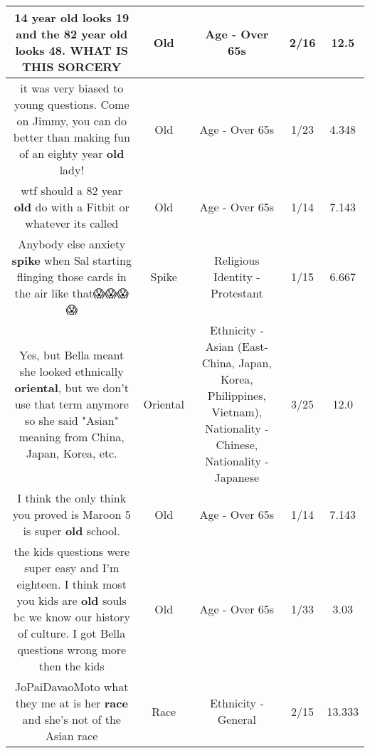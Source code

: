 \documentclass[11pt]{article}
\newlength\mylength
\begin{document}
\begin{center}
\begin{longtable}{|C{.65\mylength}|C{.30\mylength}|C{.12\mylength}|C{.12\mylength}|C{.12\mylength}|}
  \small 14 year \textbf{old} looks 19 and the 82 year \textbf{old} looks 48. WHAT IS THIS SORCERY\normalsize   & Old & Age - Over 65s & 2/16 & 12.5 \\  \hline
  \small it was very biased to young questions. Come on Jimmy, you can do better than making fun of an eighty year \textbf{old} lady!\normalsize   & Old & Age - Over 65s & 1/23 & 4.348 \\  \hline
  \small wtf should a 82 year \textbf{old} do with a Fitbit or whatever its called\normalsize   & Old & Age - Over 65s & 1/14 & 7.143 \\  \hline
  \small Anybody else anxiety \textbf{spike} when Sal starting flinging those cards in the air like that😱😱😱😱\normalsize   & Spike & Religious Identity - Protestant & 1/15 & 6.667 \\  \hline
  \small Yes, but Bella meant she looked ethnically \textbf{o\textbf{r\textbf{iental}}}, but we don't use that term anymore so she said "Asian" meaning from China, Japan, Korea, etc.\normalsize   & Oriental & Ethnicity - Asian (East- China, Japan, Korea, Philippines, Vietnam), Nationality - Chinese, Nationality - Japanese & 3/25 & 12.0 \\  \hline
  \small I think the only think you proved is Maroon 5 is super \textbf{old} school.\normalsize   & Old & Age - Over 65s & 1/14 & 7.143 \\  \hline
  \small the kids questions were super easy and I'm eighteen. I think most you kids are \textbf{old} souls bc we know our history of culture. I got Bella questions wrong more then the kids\normalsize   & Old & Age - Over 65s & 1/33 & 3.03 \\  \hline
  \small JoPaiDavaoMoto what they me at is her \textbf{race} and she's not of the Asian race\normalsize   & Race & Ethnicity - General & 2/15 & 13.333 \\  \hline

\end{longtable}
\end{center}
\end{document}
